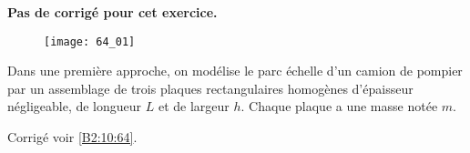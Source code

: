 \normaltrue \difficilefalse \tdifficilefalse
\correctionfalse


\setcounter{numques}{0}
\ifcorrection
\else
\textbf{Pas de corrigé pour cet exercice.}
\fi




\begin{figure}[H]
\centering
\texttt{[image: 64\_01]}
\end{figure}
\fi


Dans une première approche, on modélise le parc échelle d'un camion de pompier par un assemblage de trois plaques
rectangulaires homogènes d’épaisseur négligeable, de longueur $L$ et de largeur $h$. Chaque plaque a une masse notée $m$.

\ifprof
\else
\fi



\ifprof
\else
\begin{flushright}
\footnotesize{Corrigé voir \ref{B2:10:64}.}
\end{flushright}%
\fi